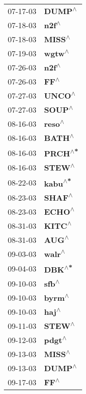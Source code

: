 \begin{supertabular}{p{0.08\textwidth}p{0.2\textwidth}}
 07-17-03 &    \textbf{DUMP\textsuperscript{$\wedge$}} \\
 07-18-03 &     \textbf{n2f\textsuperscript{$\wedge$}} \\
 07-18-03 &    \textbf{MISS\textsuperscript{$\wedge$}} \\
 07-19-03 &    \textbf{wgtw\textsuperscript{$\wedge$}} \\
 07-26-03 &     \textbf{n2f\textsuperscript{$\wedge$}} \\
 07-26-03 &      \textbf{FF\textsuperscript{$\wedge$}} \\
 07-27-03 &    \textbf{UNCO\textsuperscript{$\wedge$}} \\
 07-27-03 &    \textbf{SOUP\textsuperscript{$\wedge$}} \\
 08-16-03 &    \textbf{reso\textsuperscript{$\wedge$}} \\
 08-16-03 &    \textbf{BATH\textsuperscript{$\wedge$}} \\
 08-16-03 &   \textbf{PRCH\textsuperscript{$\wedge$*}} \\
 08-16-03 &    \textbf{STEW\textsuperscript{$\wedge$}} \\
 08-22-03 &   \textbf{kabu\textsuperscript{$\wedge$*}} \\
 08-23-03 &    \textbf{SHAF\textsuperscript{$\wedge$}} \\
 08-23-03 &    \textbf{ECHO\textsuperscript{$\wedge$}} \\
 08-31-03 &    \textbf{KITC\textsuperscript{$\wedge$}} \\
 08-31-03 &     \textbf{AUG\textsuperscript{$\wedge$}} \\
 09-03-03 &    \textbf{walr\textsuperscript{$\wedge$}} \\
 09-04-03 &    \textbf{DBK\textsuperscript{$\wedge$*}} \\
 09-10-03 &     \textbf{sfb\textsuperscript{$\wedge$}} \\
 09-10-03 &    \textbf{byrm\textsuperscript{$\wedge$}} \\
 09-10-03 &     \textbf{haj\textsuperscript{$\wedge$}} \\
 09-11-03 &    \textbf{STEW\textsuperscript{$\wedge$}} \\
 09-12-03 &    \textbf{pdgt\textsuperscript{$\wedge$}} \\
 09-13-03 &    \textbf{MISS\textsuperscript{$\wedge$}} \\
 09-13-03 &    \textbf{DUMP\textsuperscript{$\wedge$}} \\
 09-17-03 &      \textbf{FF\textsuperscript{$\wedge$}} \\

\end{supertabular}
